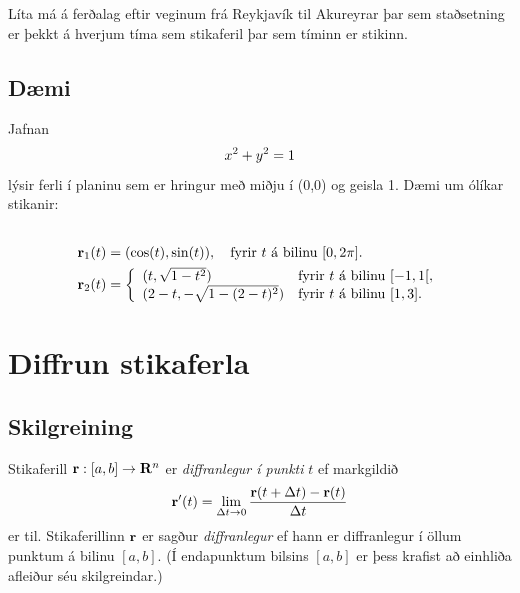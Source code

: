 \documentclass[a4paper,10pt,icelandic]{sphinxmanual}
\begin{document}
Líta má á ferðalag eftir veginum frá Reykjavík til Akureyrar þar sem
staðsetning er þekkt á hverjum tíma sem stikaferil þar sem tíminn er
stikinn.


\subsection{Dæmi}
\label{Kafli1:daemi}
Jafnan
\begin{gather}
\begin{split}\displaystyle x^2+y^2 = 1\end{split}\notag
\end{gather}
lýsir ferli í planinu sem er hringur með miðju í (0,0) og geisla 1. Dæmi
um ólíkar stikanir:
\begin{gather}
\begin{split}\displaystyle\end{split}\notag\\\begin{split}\begin{aligned}
\mbox{${\bf r}$}_1(t) &= (\cos(t),\sin(t)), \quad \text{fyrir $t$ á bilinu $[0,2\pi].$} \\
\mbox{${\bf r}$}_2(t) &= \left\{\begin{array}{ll}
(t,\sqrt{1-t^2}) & \text{fyrir $t$ á bilinu $[-1,1[,$} \\
(2-t,-\sqrt{1-(2-t)^2}) & \text{fyrir $t$ á bilinu $[1,3].$}
\end{array}\right.\end{aligned}\end{split}\notag
\end{gather}

\section{Diffrun stikaferla}
\label{Kafli1:diffrun-stikaferla}

\subsection{Skilgreining}
\label{Kafli1:index-2}\label{Kafli1:id2}
Stikaferill
\(\mbox{${\bf r}$}:  [a,b]\rightarrow \mbox{${\bf R}^n$}\) er
\emph{diffranlegur í punkti} \(t\) ef markgildið
\begin{gather}
\begin{split}\displaystyle \mbox{${\bf r}$}'(t)=\lim_{\Delta t\rightarrow 0}\frac{\mbox{${\bf r}$}(t+\Delta t)-\mbox{${\bf r}$}(t)}{\Delta t}\end{split}\notag
\end{gather}
er til. Stikaferillinn \(\mbox{${\bf r}$}\) er sagður \emph{diffranlegur}
ef hann er diffranlegur í öllum punktum á bilinu \([a,b]\). (Í
endapunktum bilsins \([a,b]\) er þess krafist að einhliða afleiður
séu skilgreindar.)
\end{document}
